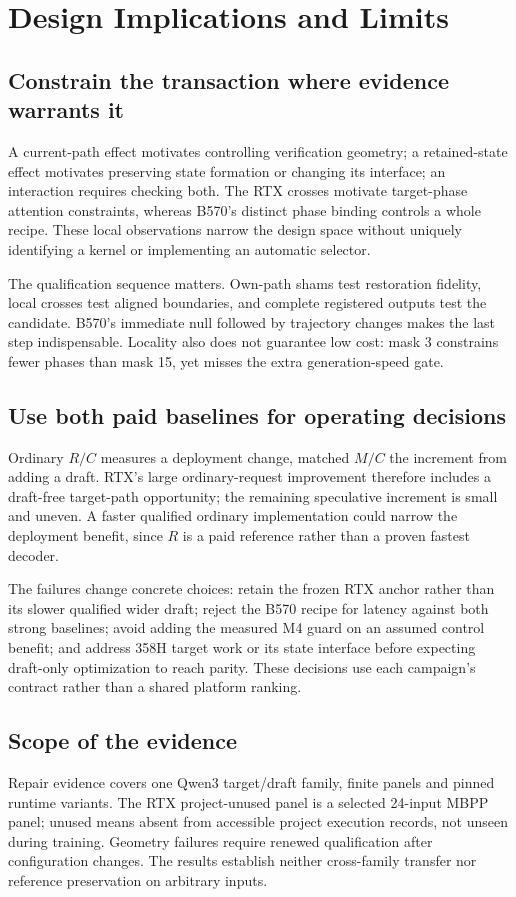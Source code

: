 \section{Design Implications and Limits}
\label{sec:implications}
\subsection{Constrain the transaction where evidence warrants it}
A current-path effect motivates controlling verification geometry; a retained-state effect motivates preserving state formation or changing its interface; an interaction requires checking both. The RTX crosses motivate target-phase attention constraints, whereas B570's distinct phase binding controls a whole recipe. These local observations narrow the design space without uniquely identifying a kernel or implementing an automatic selector.

The qualification sequence matters. Own-path shams test restoration fidelity, local crosses test aligned boundaries, and complete registered outputs test the candidate. B570's immediate null followed by trajectory changes makes the last step indispensable. Locality also does not guarantee low cost: mask 3 constrains fewer phases than mask 15, yet misses the extra generation-speed gate.

\subsection{Use both paid baselines for operating decisions}
Ordinary $R/C$ measures a deployment change, matched $M/C$ the increment from adding a draft. RTX's large ordinary-request improvement therefore includes a draft-free target-path opportunity; the remaining speculative increment is small and uneven. A faster qualified ordinary implementation could narrow the deployment benefit, since $R$ is a paid reference rather than a proven fastest decoder.

The failures change concrete choices: retain the frozen RTX anchor rather than its slower qualified wider draft; reject the B570 recipe for latency against both strong baselines; avoid adding the measured M4 guard on an assumed control benefit; and address 358H target work or its state interface before expecting draft-only optimization to reach parity. These decisions use each campaign's contract rather than a shared platform ranking.

\subsection{Scope of the evidence}
Repair evidence covers one Qwen3 target/draft family, finite panels and pinned runtime variants. The RTX project-unused panel is a selected 24-input MBPP panel; unused means absent from accessible project execution records, not unseen during training. Geometry failures require renewed qualification after configuration changes. The results establish neither cross-family transfer nor reference preservation on arbitrary inputs.

